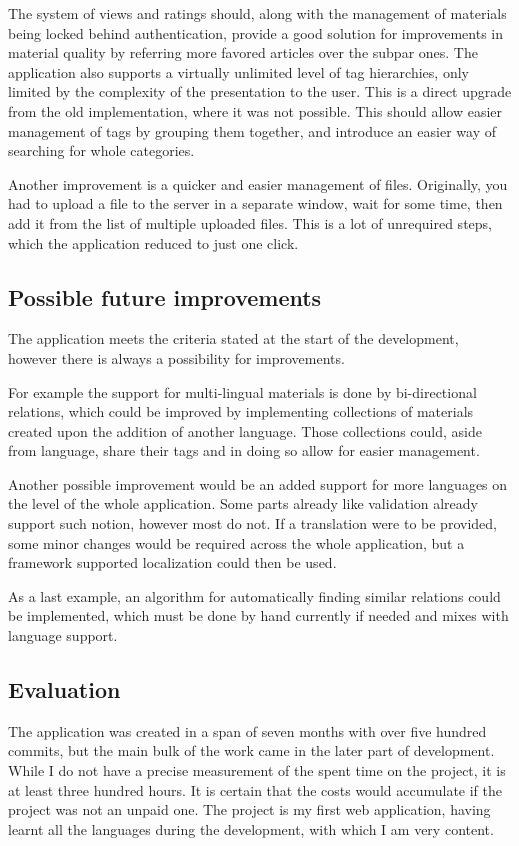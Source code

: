 \documentclass[
  digital,     %
  oneside,     %
  nosansbold,  %
  colorbold, %
  lof,         %
  lot,         %
]{fithesis4}
\begin{document}
The system of views and ratings should, along with the management of materials being locked behind authentication, provide a good solution for improvements in material quality by referring more favored articles over the subpar ones. The application also supports a virtually unlimited level of tag hierarchies, only limited by the complexity of the presentation to the user. This is a direct upgrade from the old implementation, where it was not possible. This should allow easier management of tags by grouping them together, and introduce an easier way of searching for whole categories.

Another improvement is a quicker and easier management of files. Originally, you had to upload a file to the server in a separate window, wait for some time, then add it from the list of multiple uploaded files. This is a lot of unrequired steps, which the application reduced to just one click.

\subsection{Possible future improvements}

The application meets the criteria stated at the start of the development, however there is always a possibility for improvements.

For example the support for multi-lingual materials is done by bi-directional relations, which could be improved by implementing collections of materials created upon the addition of another language. Those collections could, aside from language, share their tags and in doing so allow for easier management.

Another possible improvement would be an added support for more languages on the level of the whole application. Some parts already like validation already support such notion, however most do not. If a translation were to be provided, some minor changes would be required across the whole application, but a framework supported localization could then be used.

As a last example, an algorithm for automatically finding similar relations could be implemented, which must be done by hand currently if needed and mixes with language support.

\subsection{Evaluation}

The application was created in a span of seven months with over five hundred commits, but the main bulk of the work came in the later part of development. While I do not have a precise measurement of the spent time on the project, it is at least three hundred hours. It is certain that the costs would accumulate if the project was not an unpaid one. The project is my first web application, having learnt all the languages during the development, with which I am very content.
\end{document}
